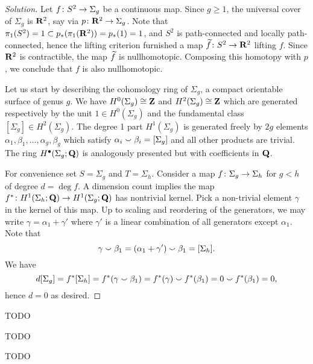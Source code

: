 \begin{proof}[Solution]
  Let $f \colon S^2 \rightarrow \Sigma_g$ be a continuous map. Since $g \geq 1$, the universal cover of $\Sigma_g$ is $\mathbf{R}^2$, say via $p \colon \mathbf{R}^2 \rightarrow \Sigma_g$. Note that $\pi_1(S^2) = 1 \subset p_\ast(\pi_1(\mathbf{R}^2)) = p_\ast(1) = 1$, and $S^2$ is path-connected and locally path-connected, hence the lifting criterion furnished a map $\widetilde{f} \colon S^2 \rightarrow \mathbf{R}^2$ lifting $f$. Since $\mathbf{R}^2$ is contractible, the map $\widetilde{f}$ is nullhomotopic. Composing this homotopy with $p$, we conclude that $f$ is also nullhomotopic.

  Let us start by describing the cohomology ring of $\Sigma_g$, a compact orientable surface of genus $g$. We have $H^0(\Sigma_g) \cong \mathbf{Z}$ and $H^2(\Sigma_g) \cong \mathbf{Z}$ which are generated respectively by the unit $1 \in H^0(\Sigma_g)$ and the fundamental class $[\Sigma_g] \in H^2(\Sigma_g)$. The degree 1 part $H^1(\Sigma_g)$ is generated freely by $2g$ elements $\alpha_1, \beta_1, \dots, \alpha_g, \beta_g$ which satisfy $\alpha_i \smallsmile \beta_i = [\Sigma_g]$ and all other products are trivial. The ring $H^\bullet(\Sigma_g;\mathbf{Q})$ is analogously presented but with coefficients in $\mathbf{Q}$.

  For convenience set $S = \Sigma_g$ and $T = \Sigma_h$. Consider a map $f \colon \Sigma_g \rightarrow \Sigma_h$ for $g < h$ of degree $d = \deg f$. A dimension count implies the map $f^\ast \colon H^1(\Sigma_h;\mathbf{Q}) \rightarrow H^1(\Sigma_g;\mathbf{Q})$ has nontrivial kernel. Pick a non-trivial element $\gamma$ in the kernel of this map. Up to scaling and reordering of the generators, we may write $\gamma = \alpha_1 + \gamma'$ where $\gamma'$ is a linear combination of all generators except $\alpha_1$. Note that
  \[
  \gamma \smallsmile \beta_1 =
  (\alpha_1 + \gamma') \smallsmile \beta_1 =
  [\Sigma_h].
  \]
  We have
  \[
  d [\Sigma_g] =
  f^\ast[\Sigma_h] =
  f^\ast(\gamma \smallsmile \beta_1) =
  f^\ast(\gamma) \smallsmile f^\ast(\beta_1) =
  0 \smallsmile f^\ast(\beta_1) = 0,
  \]
  hence $d = 0$ as desired.
\end{proof}


TODO


TODO


TODO

